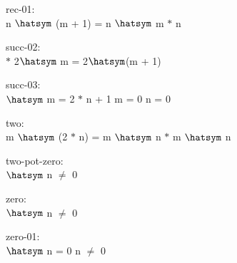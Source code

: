 \documentclass[a4paper]{article}
\begin{document}
rec-01:\\ \Fol n $\hatsym$ (m + 1) = n $\hatsym$ m $*$ n

succ-02:\\  $*$ 2$\hatsym$ m = 2$\hatsym$(m + 1)

succ-03:\\ $\hatsym$ m = 2 $*$ n + 1 \Equiv m = 0 \And n = 0

two:\\ \Fol m $\hatsym$ (2 $*$ n) = m $\hatsym$ n $*$ m $\hatsym$ n

two-pot-zero:\\  $\hatsym$ n $\neq$ 0

zero:\\ $\hatsym$ n $\neq$ 0

zero-01:\\  $\hatsym$ n = 0 \Equiv n $\neq$ 0
\end{document}
